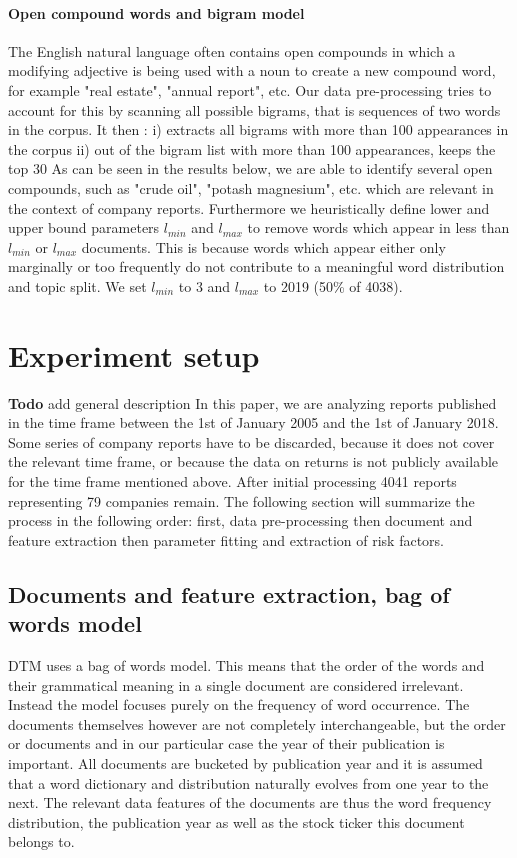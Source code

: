 \documentclass[12pt,journal,letterpaper,oneside,onecolumn]{IEEEtran}
\begin{document}
\paragraph{Open compound words and bigram model}
The English natural language often contains open compounds in which a modifying adjective is being used with a noun to create a new compound word, for example "real estate", "annual report", etc.
Our data pre-processing tries to account for this by scanning all possible bigrams, that is sequences of two words in the corpus.
It then : \newline
i) extracts all bigrams with  more than 100 appearances in the corpus \newline
ii) out of the bigram list with more than 100 appearances, keeps the top 30
As can be seen in the results below, we are able to identify several open compounds, such as "crude oil", "potash magnesium", etc. which are relevant in the context of company reports.
\newline
Furthermore we heuristically define lower and upper bound parameters $l_{min}$ and $l_{max}$ to remove words which appear in less than $l_{min}$ or $l_{max}$ documents. This is because words which appear either only marginally or too frequently do not contribute to a meaningful word distribution and topic split.
We set $l_{min}$ to 3 and $l_{max}$ to 2019 (50\% of 4038).


\section{Experiment setup}
\textbf{Todo} add general description
In this paper, we are analyzing reports published in the time frame between the 1st of January 2005 and the 1st of January 2018. Some series of company reports have to be discarded, because it does not cover the relevant time frame, or because the data on returns is not publicly available for the time frame mentioned above. After initial processing 4041 reports representing 79 companies remain. 
The following section will summarize the process in the following order: first, data pre-processing then document and feature extraction then parameter fitting and extraction of risk factors.

\subsection{Documents and feature extraction, bag of words model}
DTM uses a bag of words model. This means that the order of the words and their grammatical meaning in a single document are considered irrelevant. Instead the model focuses purely on the frequency of word occurrence. 
The documents themselves however are not completely interchangeable, but the order or documents and in our particular case the year of their publication is important.
All documents are bucketed by publication year and it is assumed that a word dictionary and distribution naturally evolves from one year to the next.
The relevant data features of the documents are thus the word frequency distribution, the publication year as well as the stock ticker this document belongs to.
\end{document}
